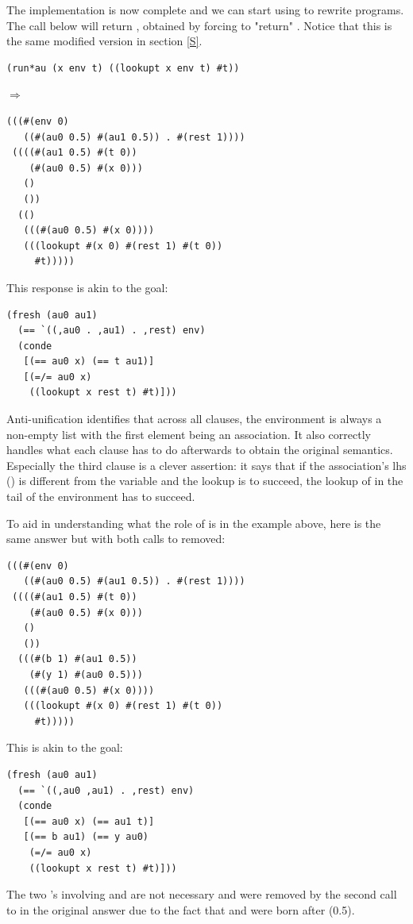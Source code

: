 The implementation is now complete and we can start using  to rewrite programs. The call below will return , obtained by forcing  to "return" . Notice that this  is the same modified version in section \ref{S}.
\begin{lstlisting}
(run*au (x env t) ((lookupt x env t) #t))
\end{lstlisting}
$\Rightarrow$
\begin{lstlisting}
(((#(env 0)
   ((#(au0 0.5) #(au1 0.5)) . #(rest 1))))
 ((((#(au1 0.5) #(t 0))
    (#(au0 0.5) #(x 0)))
   ()
   ())
  (()
   (((#(au0 0.5) #(x 0))))
   (((lookupt #(x 0) #(rest 1) #(t 0))
     #t)))))
\end{lstlisting}
This response is akin to the goal:
\begin{lstlisting}
(fresh (au0 au1)
  (== `((,au0 . ,au1) . ,rest) env)
  (conde
   [(== au0 x) (== t au1)]
   [(=/= au0 x)
    ((lookupt x rest t) #t)]))
\end{lstlisting}
Anti-unification identifies that across all clauses, the environment  is always a non-empty list with the first element being an association. It also correctly handles what each clause has to do afterwards to obtain the original semantics. Especially the third clause is a clever assertion: it says that if the association's lhs () is different from the variable  and the lookup is to succeed, the lookup of  in the tail of the environment has to succeed.

To aid in understanding what the role of  is in the example above, here is the same answer but with both calls to  removed:
\begin{lstlisting}
(((#(env 0)
   ((#(au0 0.5) #(au1 0.5)) . #(rest 1))))
 ((((#(au1 0.5) #(t 0))
    (#(au0 0.5) #(x 0)))
   ()
   ())
  (((#(b 1) #(au1 0.5))
    (#(y 1) #(au0 0.5)))
   (((#(au0 0.5) #(x 0))))
   (((lookupt #(x 0) #(rest 1) #(t 0))
     #t)))))
\end{lstlisting}
This is akin to the goal:
\begin{lstlisting}
(fresh (au0 au1)
  (== `((,au0 ,au1) . ,rest) env)
  (conde
   [(== au0 x) (== au1 t)]
   [(== b au1) (== y au0)
    (=/= au0 x)
    ((lookupt x rest t) #t)]))
\end{lstlisting}
The two \code{==}'s involving  and  are not necessary and were removed by the second call to  in the original answer due to the fact that  and  were born after  (0.5).